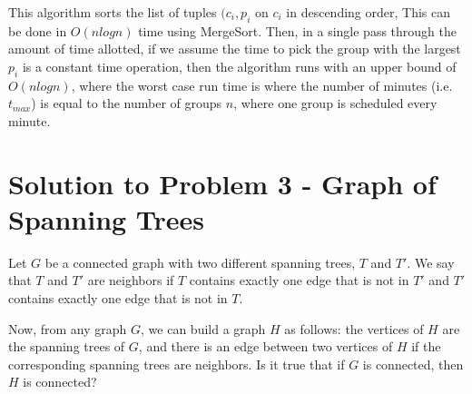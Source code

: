 \documentclass[11pt]{article}
\begin{document}
This algorithm sorts the list of tuples $(c_i, p_i$ on $c_i$ in descending order, This can be done in $O(nlogn)$ time using MergeSort. Then, in a single pass through the amount of time allotted, if we assume the time to pick the group with the largest $p_i$ is a constant time operation, then the algorithm runs with an upper bound of $O(nlogn)$, where the worst case run time is where the number of minutes (i.e. $t_{max}$) is equal to the number of groups $n$, where one group is scheduled every minute.


\newpage


\section*{Solution to Problem 3 - Graph of Spanning Trees}

Let $G$ be a connected graph with two different spanning trees, $T$ and $T'$. We say that $T$ and $T'$ are neighbors if $T$ contains exactly one edge that is not in $T'$ and $T'$ contains exactly one edge that is not in $T$.

Now, from any graph $G$, we can build a graph $H$ as follows: the vertices of $H$ are the spanning trees of $G$, and there is an edge between two vertices of $H$ if the corresponding spanning trees are neighbors. Is it true that if $G$ is connected, then $H$ is connected?
\end{document}
